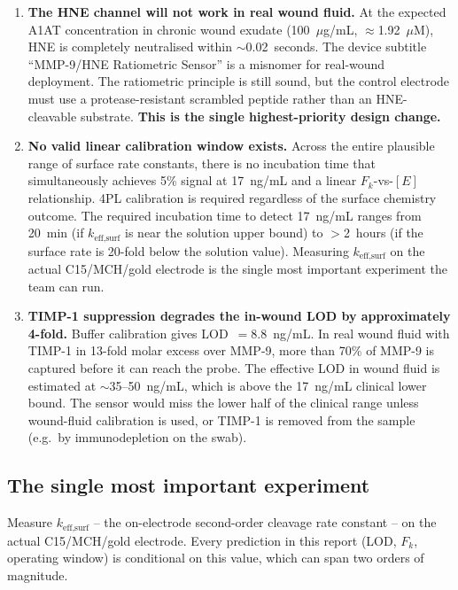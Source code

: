 \documentclass[10pt,a4paper]{article}
\begin{document}
\begin{enumerate}
\item \textbf{The HNE channel will not work in real wound fluid.} At the expected A1AT
  concentration in chronic wound exudate (100~$\mu$g/mL, $\approx$1.92~$\mu$M), HNE is
  completely neutralised within $\sim$0.02~seconds. The device subtitle ``MMP-9/HNE Ratiometric
  Sensor'' is a misnomer for real-wound deployment. The ratiometric principle is still sound,
  but the control electrode must use a protease-resistant scrambled peptide rather than an
  HNE-cleavable substrate. \textbf{This is the single highest-priority design change.}

\item \textbf{No valid linear calibration window exists.} Across the entire plausible range of
  surface rate constants, there is no incubation time that simultaneously achieves 5\% signal
  at 17~ng/mL and a linear $F_k$-vs-$[E]$ relationship. 4PL calibration is required regardless
  of the surface chemistry outcome. The required incubation time to detect 17~ng/mL ranges from
  20~min (if $k_\text{eff,surf}$ is near the solution upper bound) to $>$2~hours (if the surface
  rate is 20-fold below the solution value). Measuring $k_\text{eff,surf}$ on the actual
  C15/MCH/gold electrode is the single most important experiment the team can run.

\item \textbf{TIMP-1 suppression degrades the in-wound LOD by approximately 4-fold.} Buffer
  calibration gives LOD~$= 8.8$~ng/mL. In real wound fluid with TIMP-1 in 13-fold molar
  excess over MMP-9, more than 70\% of MMP-9 is captured before it can reach the probe.
  The effective LOD in wound fluid is estimated at $\sim$35--50~ng/mL, which is above the
  17~ng/mL clinical lower bound. The sensor would miss the lower half of the clinical range
  unless wound-fluid calibration is used, or TIMP-1 is removed from the sample (e.g.\ by
  immunodepletion on the swab).
\end{enumerate}

\subsection{The single most important experiment}

Measure $k_\text{eff,surf}$ -- the on-electrode second-order cleavage rate constant -- on the
actual C15/MCH/gold electrode. Every prediction in this report (LOD, $F_k$, operating window)
is conditional on this value, which can span two orders of magnitude.
\end{document}
